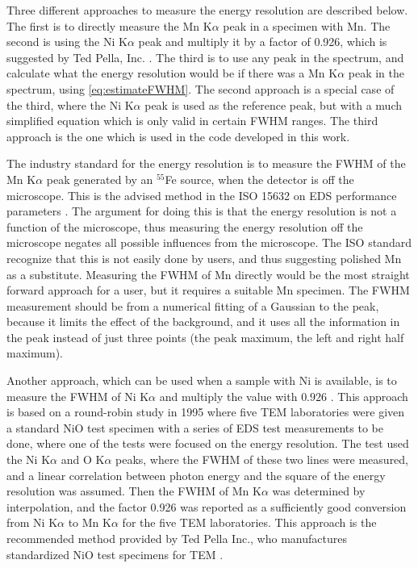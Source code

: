 Three different approaches to measure the energy resolution are described below.
The first is to directly measure the Mn K$\alpha$ peak in a specimen with Mn.
The second is using the Ni K$\alpha$ peak and multiply it by a factor of 0.926, which is suggested by Ted Pella, Inc. \cite{ted_pella_nio_tem_2019}.
The third is to use any peak in the spectrum, and calculate what the energy resolution would be if there was a Mn K$\alpha$ peak in the spectrum, using \cref{eq:estimateFWHM}.
The second approach is a special case of the third, where the Ni K$\alpha$ peak is used as the reference peak, but with a much simplified equation which is only valid in certain FWHM ranges.
The third approach is the one which is used in the code developed in this work.


The industry standard for the energy resolution is to measure the FWHM of the Mn K$\alpha$ peak generated by an $^{55}$Fe source, when the detector is off the microscope.
This is the advised method in the ISO 15632 on EDS performance parameters \cite{iso_qc_15632}.
The argument for doing this is that the energy resolution is not a function of the microscope, thus measuring the energy resolution off the microscope negates all possible influences from the microscope.
The ISO standard recognize that this is not easily done by users, and thus suggesting polished Mn as a substitute.
Measuring the FWHM of Mn directly would be the most straight forward approach for a user, but it requires a suitable Mn specimen.
The FWHM measurement should be from a numerical fitting of a Gaussian to the peak, because it limits the effect of the background, and it uses all the information in the peak instead of just three points (the peak maximum, the left and right half maximum).


Another approach, which can be used when a sample with Ni is available, is to measure the FWHM of Ni K$\alpha$ and multiply the value with $0.926$ \cite{bennett_egerton_1995}.
This approach is based on a round-robin study in 1995 \cite{bennett_egerton_1995} where five TEM laboratories were given a standard NiO test specimen with a series of EDS test measurements to be done, where one of the tests were focused on the energy resolution.
The test used the Ni K$\alpha$ and O K$\alpha$ peaks, where the FWHM of these two lines were measured, and a linear correlation between photon energy and the square of the energy resolution was assumed.
Then the FWHM of Mn K$\alpha$ was determined by interpolation, and the factor 0.926 was reported as a sufficiently good conversion from Ni K$\alpha$ to Mn K$\alpha$ for the five TEM laboratories.
This approach is the recommended method provided by Ted Pella Inc., who manufactures standardized NiO test specimens for TEM \cite{egerton_nio_characterization_1994,ted_pella_nio_tem_2019}.


